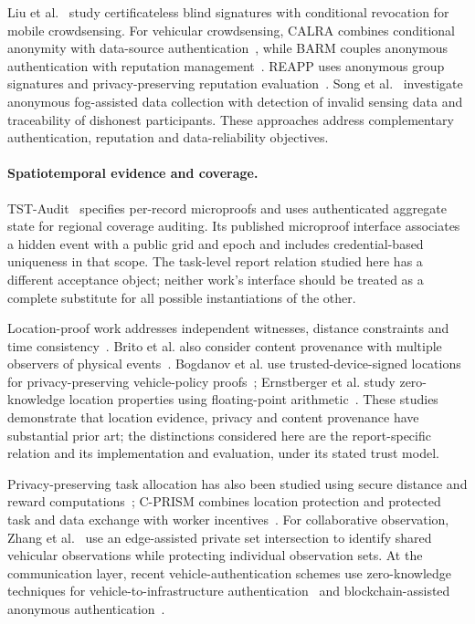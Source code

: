\documentclass[pdflatex,iicol,sn-mathphys-num]{sn-jnl}
\begin{document}
Liu et al.~\citep{Liu2024ConditionalBlind} study certificateless blind signatures with conditional revocation for mobile crowdsensing. For vehicular crowdsensing, CALRA combines conditional anonymity with data-source authentication~\citep{Xiao2025CALRA}, while BARM couples anonymous authentication with reputation management~\citep{Zheng2025BARM}. REAPP uses anonymous group signatures and privacy-preserving reputation evaluation~\citep{Li2025REAPP}. Song et al.~\citep{Song2026FogAnonymous} investigate anonymous fog-assisted data collection with detection of invalid sensing data and traceability of dishonest participants. These approaches address complementary authentication, reputation and data-reliability objectives.

\paragraph{Spatiotemporal evidence and coverage.} TST-Audit~\citep{He2026TSTAudit} specifies per-record microproofs and uses authenticated aggregate state for regional coverage auditing. Its published microproof interface associates a hidden event with a public grid and epoch and includes credential-based uniqueness in that scope. The task-level report relation studied here has a different acceptance object; neither work's interface should be treated as a complete substitute for all possible instantiations of the other.

Location-proof work addresses independent witnesses, distance constraints and time consistency~\citep{Brito2025DecentralizedPoL}. Brito et al. also consider content provenance with multiple observers of physical events~\citep{Brito2026ContentProvenance}. Bogdanov et al. use trusted-device-signed locations for privacy-preserving vehicle-policy proofs~\citep{Bogdanov2025VehiclePolicy}; Ernstberger et al. study zero-knowledge location properties using floating-point arithmetic~\citep{Ernstberger2025ZKLP}. These studies demonstrate that location evidence, privacy and content provenance have substantial prior art; the distinctions considered here are the report-specific relation and its implementation and evaluation, under its stated trust model.

Privacy-preserving task allocation has also been studied using secure distance and reward computations~\citep{Li2025LocationReward}; C-PRISM combines location protection and protected task and data exchange with worker incentives~\citep{Bai2026CPRISM}. For collaborative observation, Zhang et al.~\citep{Zhang2026EAPSI} use an edge-assisted private set intersection to identify shared vehicular observations while protecting individual observation sets. At the communication layer, recent vehicle-authentication schemes use zero-knowledge techniques for vehicle-to-infrastructure authentication~\citep{Naskar2025V2I} and blockchain-assisted anonymous authentication~\citep{Wang2025ZKAuth}.
\end{document}
